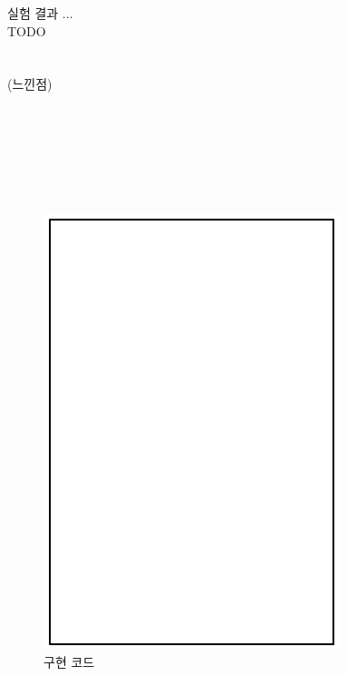\documentclass[conference,11pt]{IEEEtran}
\begin{document}
\begin{CJK}{UTF8}{}
    실험 결과 ... \\
    TODO \\
    \\
    \\
    (느낀점) \\
    \\
    \\
    \\
    \\
    \\
    \\

    
    

    \begin{figure}[p]
        \centerline{\includegraphics[width=\textwidth]{code.png}}
        \caption{구현 코드}
        \label{fig:code}
    \end{figure}

\end{CJK} %
\end{document}
